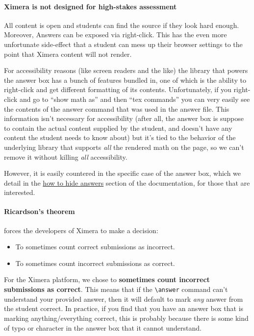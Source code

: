 \documentclass{ximera}
\begin{document}
\paragraph{Ximera is not designed for high-stakes assessment} All content is
open and students can find the source if they look hard enough. Moreover,
Answers can be exposed via right-click. This has the even more unfortunate
side-effect that a student can mess up their browser settings to the point that
Ximera content will not render.

For accessibility reasons (like screen readers and the like) the library
that powers the answer box has a bunch of features bundled in, one of which is
the ability to right-click and get different formatting of its contents.
Unfortunately, if you right-click and go to ``show math as'' and then ``tex
commands'' you can very easily see the contents of the answer command that was
used in the answer file. This information isn't necessary for accessibility
(after all, the answer box is suppose to contain the actual content supplied by
the student, and doesn't have any content the student needs to know about) but
it's tied to the behavior of the underlying library that supports \textit{all}
the rendered math on the page, so we can't remove it without killing
\textit{all} accessibility.

However, it is easily countered in the specific case of the answer box,
which we detail in the
\href{https://xronos.clas.ufl.edu/examples/exampleCore/supplemental/hiddenAnswers}{how
  to hide answers} section of the documentation, for those that are interested.

\paragraph{Ricardson's theorem} forces the developers of Ximera to make a
decision:
\begin{itemize}
  \item To sometimes count correct submissions as incorrect.
  \item To sometimes count incorrect submissions as correct.
\end{itemize}
For the Ximera platform, we chose to \textbf{sometimes count incorrect
  submissions as correct}. This means that if the \verb|\answer| command
can't understand your provided answer, then it will default to mark
\textit{any} answer from the student correct. In practice, if you find that you
have an answer box that is marking anything/everything correct, this is
probably because there is some kind of typo or character
in the answer box that it cannot understand.
\end{document}
